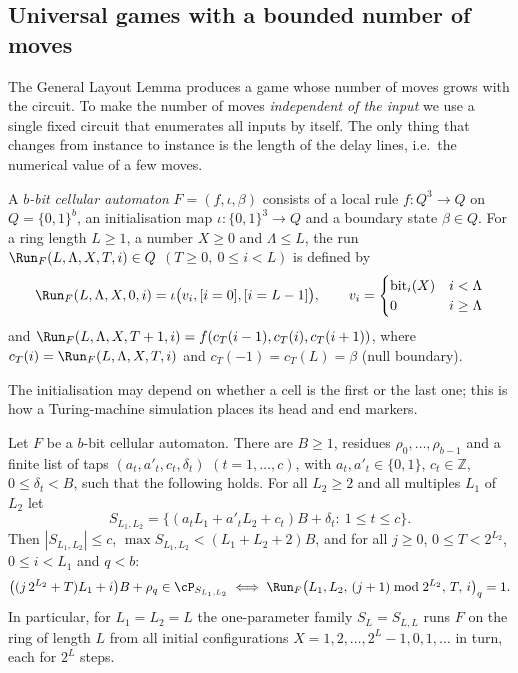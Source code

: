 \subsection{Universal games with a bounded number of moves}\label{sec:univ}

The General Layout Lemma produces a game whose number of moves grows with the circuit.  To make the
number of moves \emph{independent of the input} we use a single fixed circuit that enumerates all
inputs by itself.  The only thing that changes from instance to instance is the length of the delay
lines, i.e.\ the numerical value of a few moves.

\begin{definition}\label{def:ca}
A \emph{$b$-bit cellular automaton} $F=(f,\iota,\beta)$ consists of a local rule
$f:Q^3\to Q$ on $Q=\{0,1\}^b$, an initialisation map $\iota:\{0,1\}^3\to Q$ and a boundary state
$\beta\in Q$.  For a ring length $L\ge1$, a number $X\ge0$ and $\Lambda\le L$, the run
$\Run_F(L,\Lambda,X,T,i)\in Q$ $(T\ge0,\ 0\le i<L)$ is defined by
\[\Run_F(L,\Lambda,X,0,i)=\iota\bigl(v_i,[i=0],[i=L-1]\bigr),\qquad v_i=\begin{cases}\mathrm{bit}_i(X)&i<\Lambda\\0&i\ge\Lambda\end{cases}\]
and $\Run_F(L,\Lambda,X,T+1,i)=f(c_T(i-1),c_T(i),c_T(i+1))$, where $c_T(i)=\Run_F(L,\Lambda,X,T,i)$ and
$c_T(-1)=c_T(L)=\beta$ (null boundary).
\end{definition}

The initialisation may depend on whether a cell is the first or the last one; this is how a
Turing-machine simulation places its head and end markers.

\begin{theorem}\label{thm:univ}
Let $F$ be a $b$-bit cellular automaton.  There are $B\ge1$, residues $\rho_0,\dots,\rho_{b-1}$ and a
finite list of taps $(a_t,a'_t,c_t,\delta_t)$ $(t=1,\dots,c)$, with $a_t,a'_t\in\{0,1\}$, $c_t\in\mathbb{Z}$,
$0\le\delta_t<B$, such that the following holds.  For all $L_2\ge2$ and all multiples $L_1$ of $L_2$ let
\[S_{L_1,L_2}=\{(a_tL_1+a'_tL_2+c_t)B+\delta_t:\ 1\le t\le c\}.\]
Then $|S_{L_1,L_2}|\le c$, $\max S_{L_1,L_2}<(L_1+L_2+2)B$, and for all $j\ge0$, $0\le T<2^{L_2}$,
$0\le i<L_1$ and $q<b$:
\[
\bigl((j\,2^{L_2}+T)L_1+i\bigr)B+\rho_q\in\cP_{S_{L_1,L_2}}\iff
\Run_F\bigl(L_1,L_2,\,(j+1)\bmod 2^{L_2},\,T,\,i\bigr)_q=1 .
\]
In particular, for $L_1=L_2=L$ the one-parameter family $S_L=S_{L,L}$ runs $F$ on the ring of length
$L$ from all initial configurations $X=1,2,\dots,2^L-1,0,1,\dots$ in turn, each for $2^L$ steps.
\end{theorem}


